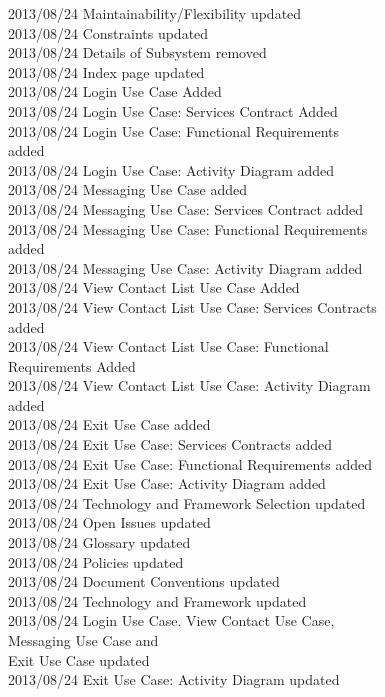 \documentclass[29pt,a4paper]{moderncv}
\begin{document}
\begin{tabbing}
2013/08/24  \> Maintainability/Flexibility updated\\
2013/08/24  \> Constraints updated\\
2013/08/24  \> Details of Subsystem removed\\
2013/08/24  \> Index page updated\\
2013/08/24  \> Login Use Case Added\\
2013/08/24  \> Login Use Case: Services Contract Added \\
2013/08/24  \> Login Use Case: Functional Requirements \\ \> \> added\\
2013/08/24  \> Login Use Case: Activity Diagram added\\
2013/08/24  \> Messaging Use Case added\\
2013/08/24  \> Messaging Use Case: Services Contract added\\
2013/08/24  \> Messaging Use Case: Functional Requirements\\ \> \> added\\
2013/08/24  \> Messaging Use Case: Activity Diagram added\\
2013/08/24  \> View Contact List Use Case Added\\
2013/08/24  \> View Contact List Use Case: Services Contracts\\ \> \> added\\
2013/08/24  \> View Contact List Use Case: Functional\\ \> \> Requirements Added\\
2013/08/24  \> View Contact List Use Case: Activity Diagram\\ \> \> added\\
2013/08/24  \> Exit Use Case added\\
2013/08/24  \> Exit Use Case: Services Contracts added\\
2013/08/24  \> Exit Use Case: Functional Requirements added\\
2013/08/24  \> Exit Use Case: Activity Diagram added\\
2013/08/24  \> Technology and Framework Selection updated\\
2013/08/24  \> Open Issues updated\\
2013/08/24  \> Glossary updated\\
2013/08/24  \> Policies updated\\
2013/08/24  \> Document Conventions updated \\
2013/08/24  \> Technology and Framework updated\\
2013/08/24 \> Login Use Case. View Contact Use Case,\\ \> \> Messaging Use Case and \\ \> \>Exit Use Case updated\\
2013/08/24 \> Exit Use Case: Activity Diagram updated\\

\end{tabbing}
\end{document}
